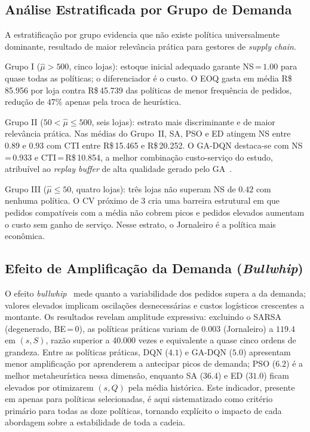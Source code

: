 \documentclass[a4paper,11pt]{article}
\begin{document}
\subsection{Análise Estratificada por Grupo de Demanda}

A estratificação por grupo evidencia que não existe política
universalmente dominante, resultado de maior relevância prática
para gestores de \textit{supply chain}.

Grupo I ($\hat{\mu} > 500$, cinco lojas): estoque inicial
adequado garante NS\,=\,$1.00$ para quase todas as políticas; o
diferenciador é o custo. O EOQ gasta em média R\$\,85.956 por loja
contra R\$\,45.739 das políticas de menor frequência de pedidos,
redução de $47\%$ apenas pela troca de heurística.

Grupo II ($50 < \hat{\mu} \leq 500$, seis lojas): estrato
mais discriminante e de maior relevância prática. Nas médias do
Grupo~II, SA, PSO e ED atingem NS entre $0.89$ e $0.93$ com CTI
entre R\$\,15.465 e R\$\,20.252. O GA-DQN destaca-se com
NS\,=\,$0.933$ e CTI\,=\,R\$\,10.854, a melhor combinação
custo-serviço do estudo, atribuível ao \textit{replay buffer} de
alta qualidade gerado pelo GA~\citep{oroojlooyjadid:2022}.

Grupo III ($\hat{\mu} \leq 50$, quatro lojas): três lojas
não superam NS de $0.42$ com nenhuma política. O CV próximo de 3
cria uma barreira estrutural em que pedidos compatíveis com a média
não cobrem picos e pedidos elevados aumentam o custo sem ganho de
serviço. Nesse estrato, o Jornaleiro é a política mais econômica.

\subsection{Efeito de Amplificação da Demanda (\textit{Bullwhip})}

O efeito \textit{bullwhip}~\citep{lee:1997} mede quanto a
variabilidade dos pedidos supera a da demanda; valores elevados
implicam oscilações desnecessárias e custos logísticos crescentes a
montante. Os resultados revelam amplitude expressiva: excluindo o SARSA
(degenerado, BE\,=\,0), as políticas práticas variam de $0.003$
(Jornaleiro) a $119.4$ em $(s,S)$, razão superior a 40.000 vezes
e equivalente a quase cinco ordens de grandeza. Entre as políticas
práticas, DQN ($4.1$) e GA-DQN ($5.0$) apresentam menor
amplificação por aprenderem a antecipar picos de demanda; PSO ($6.2$)
é a melhor metaheurística nessa dimensão, enquanto SA ($36.4$) e ED
($31.0$) ficam elevados por otimizarem $(s,Q)$ pela média histórica.
Este indicador, presente em \citet{zabraoui:2025}
apenas para políticas selecionadas, é aqui sistematizado como critério
primário para todas as doze políticas, tornando explícito o impacto
de cada abordagem sobre a estabilidade de toda a cadeia.
\end{document}
